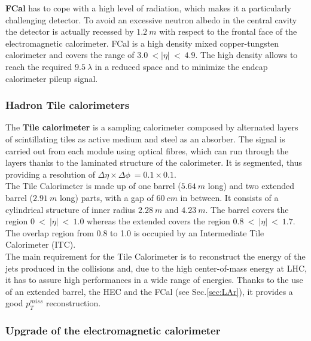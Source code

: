 \documentclass[a4paper,twoside,12pt]{article}
\begin{document}
\textbf{FCal} has to cope with a high level of radiation, which makes it a particularly challenging detector. To avoid an excessive neutron albedo in the central cavity the detector is actually recessed by 
$1.2\ m$ with respect to the frontal face of the electromagnetic calorimeter. FCal is a high density mixed copper-tungsten calorimeter and covers the range of $3.0\ < |\eta|\ <\ 4.9$.  The high density allows to reach the required $9.5\ \lambda$ in a reduced space and to minimize the endcap calorimeter pileup signal.  \\[2pt]

\subsubsection*{Hadron Tile calorimeters}
The \textbf{Tile calorimeter} is a sampling calorimeter composed by alternated layers of scintillating tiles as active medium and steel as an absorber. The signal is carried out from each module using optical fibres, which can run through the layers thanks to the laminated structure of the calorimeter. It is segmented, thus providing a resolution of
$\Delta\eta \times \Delta\phi\ = 0.1 \times 0.1$.\\
The Tile Calorimeter is made up of one barrel ($5.64\ m$ long) and two extended barrel ($2.91\ m$ long) parts, with a gap of $60\ cm$ in between. It consists of a cylindrical structure of inner radius $2.28\ m$ and $4.23\ m$. The barrel covers the region $0\ <\ |\eta|\ <\ 1.0$ whereas the extended covers the region $0.8\ <\ |\eta|\ <\ 1.7$. The overlap region from 0.8 to 1.0 is
occupied by an Intermediate Tile Calorimeter (ITC).\\
The main requirement for the Tile Calorimeter is to reconstruct the energy of the jets produced in the collisions and, due to the high center-of-mass energy at LHC, it has to assure 
high performances in a wide range of energies. Thanks to the use of an extended barrel, the HEC and the FCal (see Sec.\ref{sec:LAr}), it provides a good $p_T^{miss}$ reconstruction.\\[2pt]

\subsubsection{Upgrade of the electromagnetic calorimeter}
\end{document}
